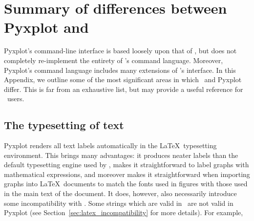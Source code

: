 %
%
%
%
%



\chapter{Summary of differences between Pyxplot and \gnuplot}
\label{ch:gnuplot_diffs}

Pyxplot's command-line interface is based loosely upon that of \gnuplot, but
does not completely re-implement the entirety of \gnuplot's command language.
Moreover, Pyxplot's command language includes many extensions of \gnuplot's
interface. In this Appendix, we outline some of the most significant areas in
which \gnuplot\ and Pyxplot differ. This is far from an exhaustive list, but
may provide a useful reference for \gnuplot\ users.

\section{The typesetting of text}

Pyxplot renders all text labels automatically in the \LaTeX\ typesetting
environment. This brings many advantages: it produces neater labels than the
default typesetting engine used by \gnuplot, makes it straightforward to label
graphs with mathematical expressions, and moreover makes it straightforward
when importing graphs into \LaTeX\ documents to match the fonts used in figures
with those used in the main text of the document.  It does, however, also
necessarily introduce some incompatibility with \gnuplot.  Some strings which
are valid in \gnuplot\ are not valid in Pyxplot (see
Section~\ref{sec:latex_incompatibility} for more details). For
example,

